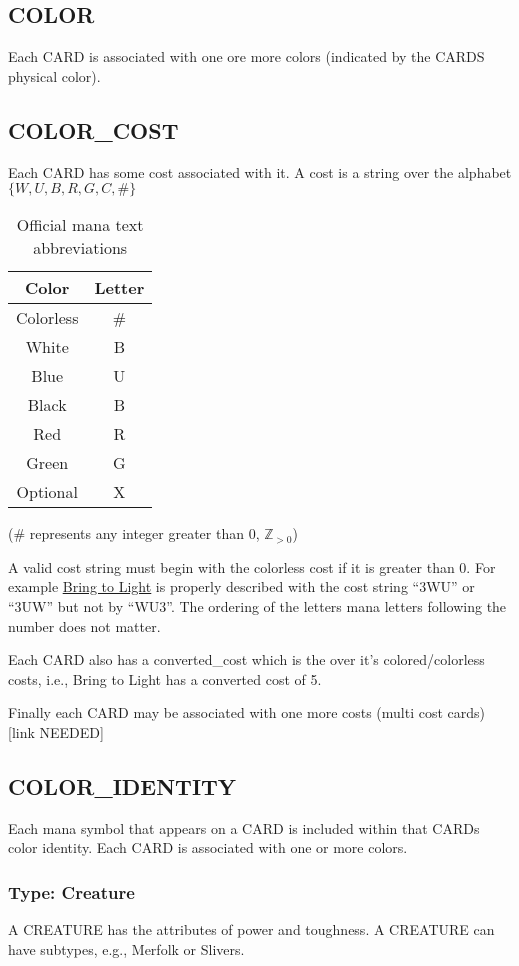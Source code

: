 \documentclass{article}
\begin{document}
\subsection{COLOR}
Each CARD is associated with one ore more colors (indicated by the CARDS physical color).
\subsection{COLOR\_COST}
Each CARD has some cost associated with it. A cost is a string over the alphabet $\{W, U, B, R, G, C, \#\}$
\begin{table}[h!] %
    \centering
    \caption{Official mana text abbreviations}
    \label{tab:cost_table}
    \begin{tabular}{cc}
        Color & Letter \\
        \hline
        Colorless & \# \\
        White & B \\
        Blue & U \\
        Black & B \\
        Red & R \\
        Green & G \\
        Optional & X \\
        \hline
    \end{tabular}
\end{table}
(\# represents any integer greater than 0, $ \mathbb{Z}_{>0}$)

A valid cost string must begin with the colorless cost if it is greater than 0. For example \href{https://scryfall.com/card/pbfz/209s/bring-to-light}{\underline{Bring to Light}} is properly described with the cost string ``3WU'' or ``3UW'' but not by ``WU3''. The ordering of the letters mana letters following the number does not matter.

Each CARD also has a converted\_cost which is the over it's colored/colorless costs, i.e., Bring to Light has a converted cost of 5. 

Finally each CARD may be associated with one more costs (multi cost cards) [link NEEDED]
\subsection{COLOR\_IDENTITY}
Each mana symbol that appears on a CARD is included within that CARDs color identity. Each CARD is associated with one or more colors.
\subsubsection{Type: Creature}
A CREATURE has the attributes of power and toughness. %
A CREATURE can have subtypes, e.g., Merfolk or Slivers.
\end{document}
